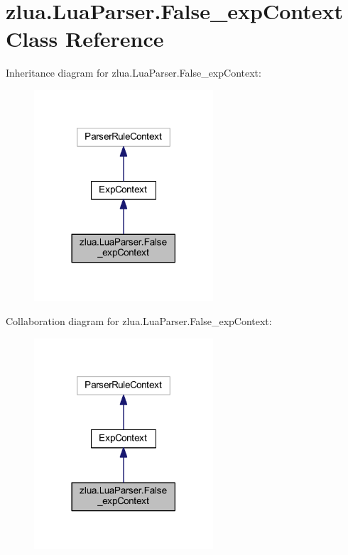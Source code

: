 \hypertarget{classzlua_1_1_lua_parser_1_1_false__exp_context}{}\section{zlua.\+Lua\+Parser.\+False\+\_\+exp\+Context Class Reference}
\label{classzlua_1_1_lua_parser_1_1_false__exp_context}


Inheritance diagram for zlua.\+Lua\+Parser.\+False\+\_\+exp\+Context\+:
\nopagebreak
\begin{figure}[H]
\begin{center}
\leavevmode
\includegraphics[width=189pt]{classzlua_1_1_lua_parser_1_1_false__exp_context__inherit__graph}
\end{center}
\end{figure}


Collaboration diagram for zlua.\+Lua\+Parser.\+False\+\_\+exp\+Context\+:
\nopagebreak
\begin{figure}[H]
\begin{center}
\leavevmode
\includegraphics[width=189pt]{classzlua_1_1_lua_parser_1_1_false__exp_context__coll__graph}
\end{center}
\end{figure}
